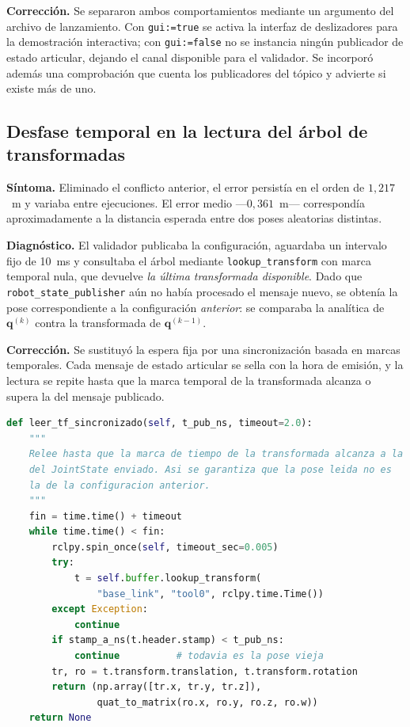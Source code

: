 \documentclass[11pt,a4paper]{article}
\newcommand{\mat}[1]{\mathbf{#1}}
\begin{document}
\textbf{Corrección.} Se separaron ambos comportamientos mediante un
argumento del archivo de lanzamiento. Con \texttt{gui:=true} se activa
la interfaz de deslizadores para la demostración interactiva; con
\texttt{gui:=false} no se instancia ningún publicador de estado
articular, dejando el canal disponible para el validador. Se incorporó
además una comprobación que cuenta los publicadores del tópico y
advierte si existe más de uno.

\subsection{Desfase temporal en la lectura del árbol de transformadas}

\textbf{Síntoma.} Eliminado el conflicto anterior, el error persistía en
el orden de $1{,}217$~m y variaba entre ejecuciones. El error medio
—$0{,}361$~m— correspondía aproximadamente a la distancia esperada entre
dos poses aleatorias distintas.

\textbf{Diagnóstico.} El validador publicaba la configuración, aguardaba
un intervalo fijo de 10~ms y consultaba el árbol mediante
\texttt{lookup\_transform} con marca temporal nula, que devuelve
\emph{la última transformada disponible}. Dado que
\texttt{robot\_state\_publisher} aún no había procesado el mensaje
nuevo, se obtenía la pose correspondiente a la configuración
\emph{anterior}: se comparaba la analítica de $\mat{q}^{(k)}$ contra la
transformada de $\mat{q}^{(k-1)}$.

\textbf{Corrección.} Se sustituyó la espera fija por una sincronización
basada en marcas temporales. Cada mensaje de estado articular se sella
con la hora de emisión, y la lectura se repite hasta que la marca
temporal de la transformada alcanza o supera la del mensaje publicado.

\begin{lstlisting}[language=Python,caption={Sincronización por marca
temporal}]
def leer_tf_sincronizado(self, t_pub_ns, timeout=2.0):
    """
    Relee hasta que la marca de tiempo de la transformada alcanza a la
    del JointState enviado. Asi se garantiza que la pose leida no es
    la de la configuracion anterior.
    """
    fin = time.time() + timeout
    while time.time() < fin:
        rclpy.spin_once(self, timeout_sec=0.005)
        try:
            t = self.buffer.lookup_transform(
                "base_link", "tool0", rclpy.time.Time())
        except Exception:
            continue
        if stamp_a_ns(t.header.stamp) < t_pub_ns:
            continue          # todavia es la pose vieja
        tr, ro = t.transform.translation, t.transform.rotation
        return (np.array([tr.x, tr.y, tr.z]),
                quat_to_matrix(ro.x, ro.y, ro.z, ro.w))
    return None
\end{lstlisting}
\end{document}
